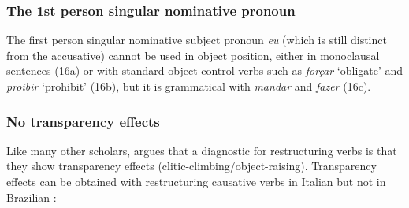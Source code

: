 \documentclass[output=paper]{langsci/langscibook}
\begin{document}
\subsubsection{The 1st person singular nominative pronoun}%

The first person singular nominative subject pronoun \textit{eu} (which is still distinct from the accusative) cannot be used in object position, either in monoclausal sentences (16a) or with standard object control verbs such as \textit{forçar} ‘obligate’ and \textit{proibir} ‘prohibit’ (16b), but it is grammatical with \textit{mandar} and \textit{fazer} (16c). 

\ea%
    \label{ex:moreno:16}
    \z
\z

\subsubsection{No transparency effects}%

Like many other scholars, \citet{Cinque2004} argues that a diagnostic for restructuring verbs is that they show transparency effects (clitic-climbing\slash object-raising). Transparency effects can be obtained with restructuring causative verbs in Italian but not in Brazilian :

\ea%
    \label{ex:moreno:17}
    \z
\z
\end{document}
